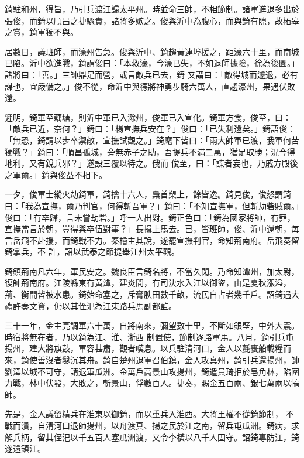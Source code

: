 \begin{pinyinscope}
 錡駐和州，得旨，乃引兵渡江歸太平州。時並命三帥，不相節制。諸軍進退多出於張俊，而錡以順昌之捷驟貴，諸將多嫉之。俊與沂中為腹心，而與錡有隙，故柘皋之賞，錡軍獨不與。



 居數日，議班師，而濠州告急。俊與沂中、錡趨黃連埠援之，距濠六十里，而南城已陷。沂中欲進戰，錡謂俊曰：「本救濠，今濠已失，不如退師據險，徐為後圖。」諸將曰：「善。」三帥鼎足而營，或言敵兵已去，錡
 又謂曰：「敵得城而遽退，必有謀也，宜嚴備之。」俊不從，命沂中與德將神勇步騎六萬人，直趨濠州，果遇伏敗還。



 遲明，錡軍至藕塘，則沂中軍已入滁州，俊軍已入宣化。錡軍方食，俊至，曰：「敵兵已近，奈何？」錡曰：「楊宣撫兵安在？」俊曰：「已失利還矣。」錡語俊：「無恐，錡請以步卒禦敵，宣撫試觀之。」錡麾下皆曰：「兩大帥軍已渡，我軍何苦獨戰？」錡曰：「順昌孤城，旁無赤子之助，吾提兵不滿二萬，猶足取勝；況今得地利，又有銳兵邪？」遂設三覆以待之。俄而
 俊至，曰：「諜者妄也，乃戚方殿後之軍爾。」錡與俊益不相下。



 一夕，俊軍士縱火劫錡軍，錡擒十六人，梟首槊上，餘皆逸。錡見俊，俊怒謂錡曰：「我為宣撫，爾乃判官，何得斬吾軍？」錡曰：「不知宣撫軍，但斬劫砦賊爾。」俊曰：「有卒歸，言未嘗劫砦。」呼一人出對。錡正色曰：「錡為國家將帥，有罪，宣撫當言於朝，豈得與卒伍對事？」長揖上馬去。已，皆班師，俊、沂中還朝，每言岳飛不赴援，而錡戰不力。秦檜主其說，遂罷宣撫判官，命知荊南府。岳飛奏留錡掌兵，不
 許，詔以武泰之節提舉江州太平觀。



 錡鎮荊南凡六年，軍民安之。魏良臣言錡名將，不當久閑。乃命知潭州，加太尉，復帥荊南府。江陵縣東有黃潭，建炎間，有司決水入江以御盜，由是夏秋漲溢，荊、衡間皆被水患。錡始命塞之，斥膏腴田數千畝，流民自占者幾千戶。詔錡遇大禮許奏文資，仍以其侄汜為江東路兵馬副都監。



 三十一年，金主亮調軍六十萬，自將南來，彌望數十里，不斷如銀壁，中外大震。時宿將無在者，乃以錡為江、淮、浙西
 制置使，節制逐路軍馬。八月，錡引兵屯揚州，建大將旗鼓，軍容甚肅，觀者嘆息。以兵駐清河口，金人以氈裹船載糧而來，錡使善沒者鑿沉其舟。錡自楚州退軍召伯鎮，金人攻真州，錡引兵還揚州，帥劉澤以城不可守，請退軍瓜洲。金萬戶高景山攻揚州，錡遣員琦拒於皂角林，陷圍力戰，林中伏發，大敗之，斬景山，俘數百人。捷奏，賜金五百兩、銀七萬兩以犒師。



 先是，金人議留精兵在淮東以御錡，而以重兵入淮西。大將王權不從錡節制，
 不戰而潰，自清河口退師揚州，以舟渡真、揚之民於江之南，留兵屯瓜洲。錡病，求解兵柄，留其侄汜以千五百人塞瓜洲渡，又令李橫以八千人固守。詔錡專防江，錡遂還鎮江。




\end{pinyinscope}
